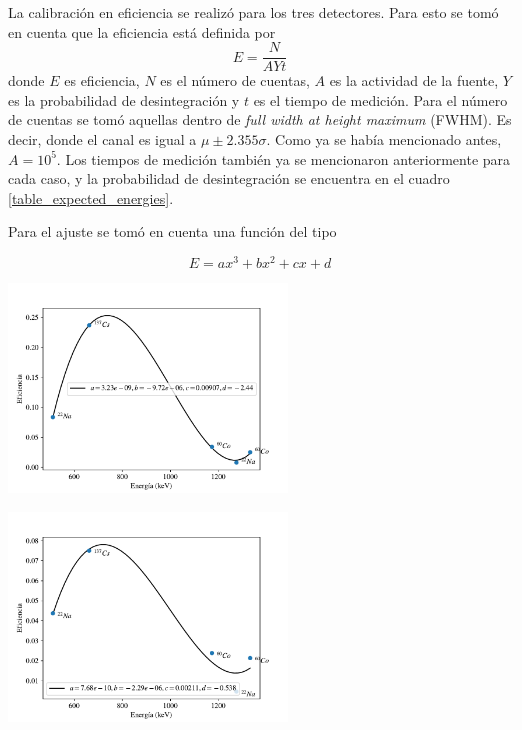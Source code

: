 \documentclass[a4paper, onecolumn]{article}
\begin{document}
		La calibración en eficiencia se realizó para los tres detectores. Para esto se tomó en cuenta que la eficiencia está definida por
		$$
		E = \frac{N}{AYt}
		$$
		donde $E$ es eficiencia, $N$ es el número de cuentas, $A$ es la actividad de la fuente, $Y$ es la probabilidad de desintegración y $t$ es el tiempo de medición. Para el número de cuentas se tomó aquellas dentro de {\it full width at height maximum} (FWHM). Es decir, donde el canal es igual a $\mu\pm2.355\sigma$. Como ya se había mencionado antes, $A=10^5$. Los tiempos de medición también ya se mencionaron anteriormente para cada caso, y la probabilidad de desintegración se encuentra en el cuadro \ref{table_expected_energies}.

		Para el ajuste se tomó en cuenta una función del tipo

		$$
		E = ax^3 + bx^2 + cx + d
		$$

		\begin{center}
			\includegraphics[width=210pt]{img/nai_33_efficiency.pdf}
		\end{center}


		\begin{center}
			\includegraphics[width=210pt]{img/hpge_efficiency.pdf}
		\end{center}
\end{document}
